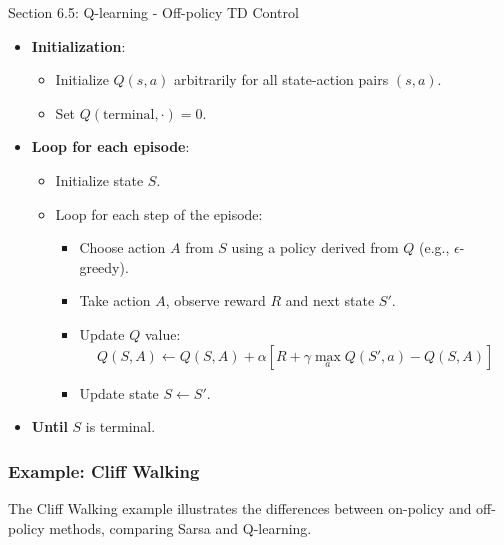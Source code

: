 \begin{notes}{Section 6.5: Q-learning - Off-policy TD Control}
\begin{highlight}
        \begin{itemize}
            \item \textbf{Initialization}:
                \begin{itemize}
                    \item Initialize $Q(s, a)$ arbitrarily for all state-action pairs $(s, a)$.
                    \item Set $Q(\text{terminal}, \cdot) = 0$.
                \end{itemize}
            \item \textbf{Loop for each episode}:
                \begin{itemize}
                    \item Initialize state $S$.
                    \item Loop for each step of the episode:
                        \begin{itemize}
                            \item Choose action $A$ from $S$ using a policy derived from $Q$ (e.g., $\epsilon$-greedy).
                            \item Take action $A$, observe reward $R$ and next state $S'$.
                            \item Update $Q$ value:
                            \[
                            Q(S, A) \leftarrow Q(S, A) + \alpha \left[ R + \gamma \max_a Q(S', a) - Q(S, A) \right]
                            \]
                            \item Update state $S \leftarrow S'$.
                        \end{itemize}
                \end{itemize}
                \item \textbf{Until} $S$ is terminal.
        \end{itemize}
    
    \end{highlight}
    
    \subsubsection*{Example: Cliff Walking}
    
    The Cliff Walking example illustrates the differences between on-policy and off-policy methods, comparing Sarsa and Q-learning.
    
    \begin{highlight}
    

\end{highlight}
\end{notes}
